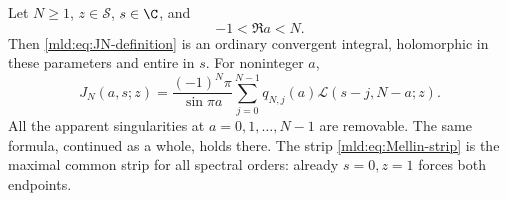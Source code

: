\begin{theorem}\label{mld:thm:Mellin-master}
Let $N\ge1$, $z\in\mathcal S$, $s\in\C$, and
\begin{equation}\label{mld:eq:Mellin-strip}
 -1<\Re a<N.
\end{equation}
Then \eqref{mld:eq:JN-definition} is an ordinary convergent integral, holomorphic in these parameters and entire in $s$. For noninteger $a$,
\begin{equation}\label{mld:eq:Mellin-master}
 \boxed{\displaystyle
 J_N(a,s;z)=\frac{(-1)^N\pi}{\sin\pi a}
       \sum_{j=0}^{N-1}q_{N,j}(a)
          \mathcal L(s-j,N-a;z).}
\end{equation}
All the apparent singularities at $a=0,1,\ldots,N-1$ are removable. The same formula, continued as a whole, holds there. The strip \eqref{mld:eq:Mellin-strip} is the maximal common strip for all spectral orders: already $s=0,z=1$ forces both endpoints.
\end{theorem}

